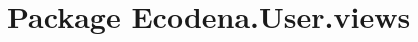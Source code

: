 \hypertarget{namespace_ecodena_1_1_user_1_1views}{
\section{Package Ecodena.User.views}
\label{d7/d84/namespace_ecodena_1_1_user_1_1views}
}
